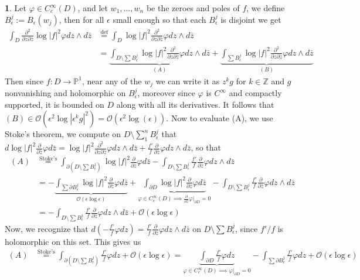 \documentclass[10.5pt]{article}
\theoremstyle{definition}
\newtheorem{pb}{}
\newcommand{\abs}[1]{\left\vert#1\right\vert}
\newcommand{\pzb}{\frac{\partial}{\partial \bar{z}}}
\newcommand{\dv}{dz\wedge d\bar{z}}
\newcommand{\pzpz}{\frac{\partial^2}{\partial z \partial \bar{z}}}
\begin{document}
    \begin{pb}
        Let \(\varphi \in C_c^\infty(D)\), and let \(w_1, \hdots, w_n\) be the zeroes and poles of \(f\), we define \(B_\epsilon^j := B_\epsilon(w_j)\), then for all \(\epsilon\) small enough so that each \(B_\epsilon^j\) is disjoint we get
        \begin{align}
            \int_D \pzpz \log\abs{f}^2 \varphi \dv &\overset{\text{def}}{=} \int_D \log\abs{f}^2 \pzpz \varphi \dv \\
            &= \underbrace{\int_{D \setminus \sum B^j_\epsilon} \log\abs{f}^2 \pzpz \varphi \dv}_{(A)} + \underbrace{\int_{\sum B_\epsilon^j} \log\abs{f}^2 \pzpz \varphi \dv}_{(B)} \label{Weakder}
        \end{align}
        Then since \(f: D \to \mathbb{P}^1\), near any of the \(w_j\) we can write it as \(z^k g\) for \(k \in \mathbb{Z}\) and \(g\) nonvanishing and holomorphic on \(B_\epsilon^j\), moreover since \(\varphi\) is \(C^\infty\) and compactly supported, it is bounded on \(D\) along with all its derivatives. It follows that \((B) \in \mathcal{O}(\epsilon^2\log\abs{\epsilon^k g}^2) = \mathcal{O}(\epsilon^2\log(\epsilon))\). Now to evaluate (A), we use Stoke's theorem, we compute on \(D \setminus \sum_1^n B_\epsilon^j\) that \(d \log \abs{f}^2 \pzb \varphi d\bar{z} = \log\abs{f}^2 \pzpz \varphi \dv + \frac{f'}{f}\pzb \varphi \dv\), so that
        \begin{align}
            (A) &\overset{\text{Stoke's}}{=} \int_{\partial (D \setminus \sum B_\epsilon^j)}\log \abs{f}^2 \pzb \varphi d\bar{z} - \int_{D \setminus \sum B_\epsilon^j} \frac{f'}{f}\pzb \varphi \dv \\
            &= -\underbrace{\int_{\sum\partial B_\epsilon^j}\log \abs{f}^2 \pzb \varphi d\bar{z}}_{\mathcal{O}(\epsilon\log \epsilon)} + \underbrace{\int_{\partial D}\log \abs{f}^2 \pzb \varphi d\bar{z}}_{\varphi \in C_c^\infty(D) \implies \pzb\varphi\vert_{\partial D} = 0} - \int_{D \setminus \sum B_\epsilon^j} \frac{f'}{f}\pzb \varphi \dv \\
            &= - \int_{D \setminus \sum B_\epsilon^j} \frac{f'}{f}\pzb \varphi \dv + \mathcal{O}(\epsilon\log \epsilon)
        \end{align}
        Now, we recognize that \(d (-\frac{f'}{f}\varphi dz) = \frac{f'}{f}\pzb \varphi \dv\) on \(D \setminus \sum B_\epsilon^j\), since \(f'/f\) is holomorphic on this set. This gives us
        \begin{align}
            (A) &\overset{\text{Stoke's}}{=} \int_{\partial (D \setminus \sum B_\epsilon^j)}\frac{f'}{f}\varphi dz + \mathcal{O}(\epsilon\log \epsilon) = \underbrace{\int_{\partial D} \frac{f'}{f}\varphi dz}_{\varphi \in C^\infty_c(D) \implies \varphi\vert_{\partial D} = 0} - \int_{\sum \partial B_\epsilon^j} \frac{f'}{f}\varphi dz + \mathcal{O}(\epsilon\log \epsilon) \\

\end{align}
\end{pb}
\end{document}
